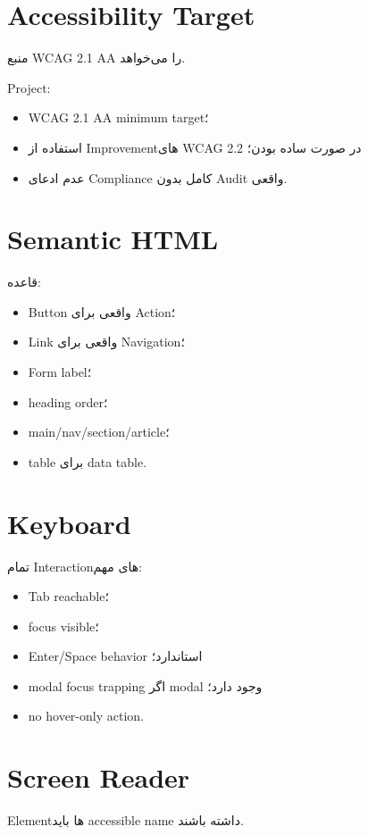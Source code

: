 \section{Accessibility Target}

منبع WCAG 2.1 AA را می‌خواهد.

Project:
\begin{itemize}
  \item WCAG 2.1 AA minimum target؛
  \item استفاده از Improvementهای WCAG 2.2 در صورت ساده بودن؛
  \item عدم ادعای Compliance کامل بدون Audit واقعی.
\end{itemize}

\section{Semantic HTML}

قاعده:
\begin{itemize}
  \item Button واقعی برای Action؛
  \item Link واقعی برای Navigation؛
  \item Form label؛
  \item heading order؛
  \item main/nav/section/article؛
  \item table برای data table.
\end{itemize}

\section{Keyboard}

تمام Interactionهای مهم:
\begin{itemize}
  \item Tab reachable؛
  \item focus visible؛
  \item Enter/Space behavior استاندارد؛
  \item modal focus trapping اگر modal وجود دارد؛
  \item no hover-only action.
\end{itemize}

\section{Screen Reader}

Elementها باید accessible name داشته باشند.

